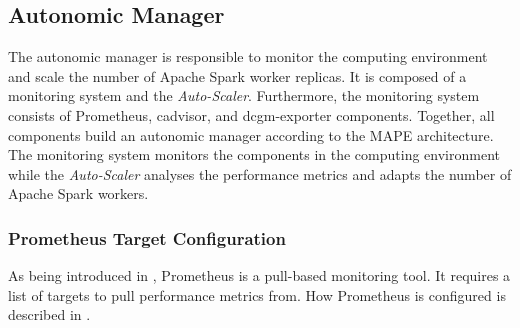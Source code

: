 \subsection{Autonomic Manager}
The autonomic manager is responsible to monitor the computing environment and scale the number of Apache Spark worker replicas.
It is composed of a monitoring system and the \textit{Auto-Scaler}.
Furthermore, the monitoring system consists of Prometheus, cadvisor, and dcgm-exporter components.
Together, all components build an autonomic manager according to the MAPE architecture.
The monitoring system monitors the components in the computing environment while the \textit{Auto-Scaler} analyses the performance metrics and adapts the number of Apache Spark workers.


\subsubsection{Prometheus Target Configuration}




As being introduced in , Prometheus is a pull-based monitoring tool.
It requires a list of targets to pull performance metrics from. How Prometheus is configured is described in .


